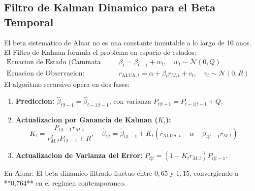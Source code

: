 \documentclass[10pt,a4paper]{article}
\theoremstyle{definition}
\begin{document}
\subsection{Filtro de Kalman Dinamico para el Beta Temporal}
El beta sistematico de Aluar no es una constante inmutable a lo largo de 10 anos. El Filtro de Kalman formula el problema en espacio de estados:
\begin{align}
\text{Ecuacion de Estado (Caminata Aleatoria):} & \quad \beta_t = \beta_{t-1} + w_t, \quad w_t \sim \mathcal{N}(0, Q) \\
\text{Ecuacion de Observacion:} & \quad r_{\text{ALUA}, t} = \alpha + \beta_t r_{M, t} + v_t, \quad v_t \sim \mathcal{N}(0, R)
\end{align}
El algoritmo recursivo opera en dos fases:
\begin{enumerate}
    \item \textbf{Prediccion:} $\hat{\beta}_{t|t-1} = \hat{\beta}_{t-1|t-1}$, con varianza $P_{t|t-1} = P_{t-1|t-1} + Q$.
    \item \textbf{Actualizacion por Ganancia de Kalman ($K_t$):}
    \begin{equation}
    K_t = \frac{P_{t|t-1} r_{M,t}}{r_{M,t}^2 P_{t|t-1} + R}, \quad \hat{\beta}_{t|t} = \hat{\beta}_{t|t-1} + K_t \left( r_{\text{ALUA}, t} - \alpha - \hat{\beta}_{t|t-1} r_{M,t} \right)
    \end{equation}
    \item \textbf{Actualizacion de Varianza del Error:} $P_{t|t} = (1 - K_t r_{M,t}) P_{t|t-1}$.
\end{enumerate}
En Aluar: El beta dinamico filtrado fluctuo entre $0,65$ y $1,15$, convergiendo a **0,764** en el regimen contemporaneo.
\end{document}
